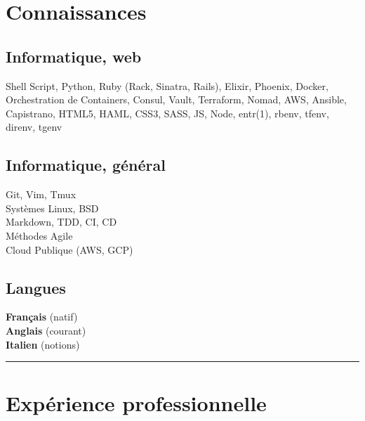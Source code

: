 \documentclass[a4paper,11pt]{article}
\newcommand{\breakvspace}[1]{\pagebreak[2]\vspace{#1}\pagebreak[2]}
\newcommand{\nobreakvspace}[1]{\nopagebreak[4]\vspace{#1}\nopagebreak[4]}
\newcommand{\spacedhrule}[2]{\breakvspace{#1}\hrule\nobreakvspace{#2}}
\begin{document}
\section*{Connaissances}
  \begin{minipage}[t]{0.29\textwidth}
    \subsection*{Informatique, web}
    Shell Script, Python, Ruby (Rack, Sinatra, Rails), Elixir, Phoenix, Docker, Orchestration de Containers, Consul, Vault, Terraform, Nomad, AWS, Ansible, Capistrano, HTML5, HAML, CSS3, SASS, JS, Node, entr(1), rbenv, tfenv, direnv, tgenv
  \end{minipage}
  \hspace{0.035\textwidth}
  \vrule
  \hspace{0.035\textwidth}
  \begin{minipage}[t]{0.28\textwidth}
    \subsection*{Informatique, général}
    Git, Vim, Tmux\\
    Systèmes Linux, BSD\\
    Markdown, TDD, CI, CD\\
    Méthodes Agile \\
    Cloud Publique (AWS, GCP) \\
  \end{minipage}
  \hspace{0.035\textwidth}
  \vrule
  \hspace{0.035\textwidth}
  \begin{minipage}[t]{0.28\textwidth}
    \subsection*{Langues}
    \textbf{Français} (natif)\\
    \textbf{Anglais} (courant)\\
    \textbf{Italien} (notions)
  \end{minipage}


\spacedhrule{1.5em}{-0.4em}

\section*{Expérience professionnelle}
\end{document}

